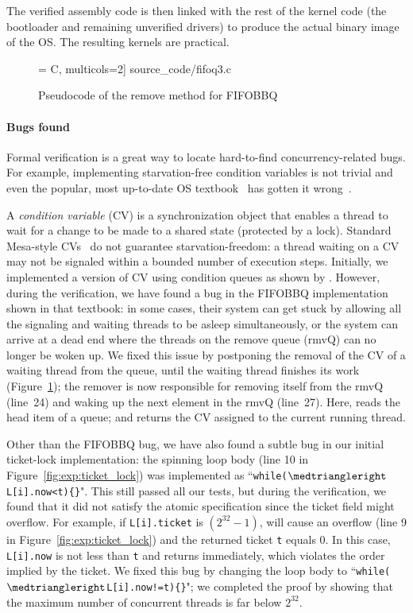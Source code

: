 The verified assembly code is then linked with the rest of the kernel code
(the bootloader and remaining unverified drivers) to produce the
actual binary image of the OS. The resulting kernels are practical.

\begin{figure}[t]
 = C, multicols=2] {source_code/fifoq3.c}
\caption{Pseudocode of the remove method for FIFOBBQ}
\label{fig:exp:fifo}
\end{figure}

\paragraph{Bugs found}
Formal verification is a great way to
locate hard-to-find concurrency-related bugs.
For example,  implementing starvation-free condition variables
is not trivial and even the popular, most up-to-date OS
textbook~\cite[Figure~5.14]{ospp11} has gotten it
wrong~\cite{anderson16}.

A \emph{condition variable} (CV) is a synchronization object that
enables a thread to wait for a change to be made to a
shared state (protected by a lock).  Standard Mesa-style
CVs~\cite{lampson80} do not guarantee starvation-freedom: a thread
waiting on a CV may not be signaled within a bounded number of
execution steps. 
Initially, we implemented a version of CV
using condition queues as shown by \citet[Figure~5.14]{ospp11}. However, during the verification,
we have found a bug in the FIFOBBQ implementation shown in that
textbook: in some cases, their system can get stuck by allowing all
the signaling and waiting threads to be asleep simultaneously, or the
system can arrive at a dead end where the threads on the remove queue
(rmvQ) can no longer be woken up.  We fixed this issue by postponing
the removal of the CV of a waiting thread from the queue, until the
waiting thread finishes its work (\cf Figure~\ref{fig:exp:fifo}); the
remover is now responsible for removing itself from the rmvQ (line~24)
and waking up the next element in the rmvQ (line~27). Here, 
reads the head item of a queue; and  returns the CV
assigned to the current running thread. 

Other than the FIFOBBQ bug,
we have also found a subtle bug in  
our initial ticket-lock implementation:   
the spinning loop body (line 10 in Figure~\ref{fig:exp:ticket_lock})
was implemented as
``\lstinline$while($$\intp$\lstinline$L[i].now<t){}$". 
This still passed all our tests, but  
during the verification,
we found that it did not satisfy the atomic specification
since the ticket field might overflow. For example, 
if \lstinline$L[i].ticket$ is $(2^{32}-1)$,  will
cause an overflow (line 9 in  Figure~\ref{fig:exp:ticket_lock}) and
the returned ticket
\lstinline$t$ equals $0$. In this case, 
\lstinline$L[i].now$ is not less than \lstinline$t$ 
and  returns immediately, which violates 
the order implied by the ticket. We fixed this bug by 
changing the loop body to 
``\lstinline$while($$\intp$\lstinline$L[i].now!=t){}$";
we completed the proof by showing that the maximum 
number of concurrent threads is far below $2^{32}$.





